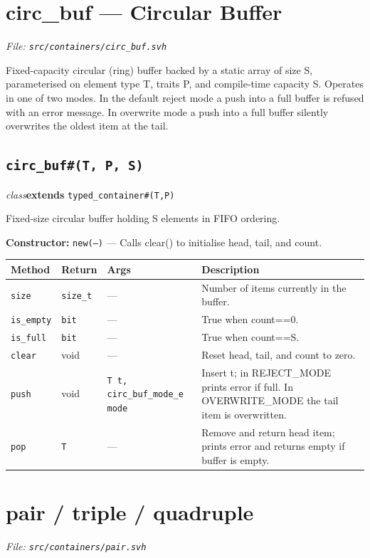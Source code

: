 \documentclass[11pt,letterpaper]{report}
\begin{document}
\section{circ\_buf --- Circular Buffer}
\noindent\small\textit{File: \texttt{src/containers/circ\_buf.svh}}\par

Fixed-capacity circular (ring) buffer backed by a static array of size S, parameterised on element type T, traits P, and compile-time capacity S. Operates in one of two modes. In the default reject mode a push into a full buffer is refused with an error message. In overwrite mode a push into a full buffer silently overwrites the oldest item at the tail.

\subsection*{\texttt{circ\_buf\#(T, P, S)}}
\noindent\small\textit{class}\quad \textbf{extends} \texttt{typed\_container\#(T,P)}\par

Fixed-size circular buffer holding S elements in FIFO ordering.

\noindent\textbf{Constructor:} \texttt{new(---)} --- Calls clear() to initialise head, tail, and count.

\begin{xltabular}{\linewidth}{>{\small}p{1.35in} >{\small}p{1.25in} >{\small}p{0.95in} >{\small}X}
\toprule
\textbf{Method} & \textbf{Return} & \textbf{Args} & \textbf{Description} \\
\midrule
\endhead
\bottomrule
\endfoot
\texttt{size} & \texttt{size\_t} & --- & Number of items currently in the buffer. \\
\texttt{is\_empty} & \texttt{bit} & --- & True when count==0. \\
\texttt{is\_full} & \texttt{bit} & --- & True when count==S. \\
\texttt{clear} & void & --- & Reset head, tail, and count to zero. \\
\texttt{push} & void & \texttt{T t, circ\_buf\_mode\_e mode} & Insert t; in REJECT\_MODE prints error if full. In OVERWRITE\_MODE the tail item is overwritten. \\
\texttt{pop} & \texttt{T} & --- & Remove and return head item; prints error and returns empty if buffer is empty. \\
\end{xltabular}

\section{pair / triple / quadruple}
\noindent\small\textit{File: \texttt{src/containers/pair.svh}}\par
\end{document}
